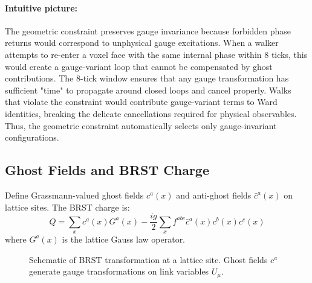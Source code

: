 \documentclass[11pt,a4paper]{article}
\theoremstyle{definition}
\theoremstyle{remark}
\begin{document}
\paragraph{Intuitive picture:} The geometric constraint preserves gauge invariance because forbidden phase returns would correspond to unphysical gauge excitations. When a walker attempts to re-enter a voxel face with the same internal phase within 8 ticks, this would create a gauge-variant loop that cannot be compensated by ghost contributions. The 8-tick window ensures that any gauge transformation has sufficient "time" to propagate around closed loops and cancel properly. Walks that violate the constraint would contribute gauge-variant terms to Ward identities, breaking the delicate cancellations required for physical observables. Thus, the geometric constraint automatically selects only gauge-invariant configurations.

\subsection{Ghost Fields and BRST Charge}

Define Grassmann-valued ghost fields $c^a(x)$ and anti-ghost fields $\bar{c}^a(x)$ on lattice sites. The BRST charge is:
\[
Q = \sum_x c^a(x) G^a(x) - \frac{ig}{2} \sum_x f^{abc} \bar{c}^a(x) c^b(x) c^c(x)
\]
where $G^a(x)$ is the lattice Gauss law operator.

\begin{figure}[ht]
\centering
{}
\caption{Schematic of BRST transformation at a lattice site. Ghost fields $c^a$ generate gauge transformations on link variables $U_\mu$.}
\label{fig:brst}
\end{figure}
\end{document}
